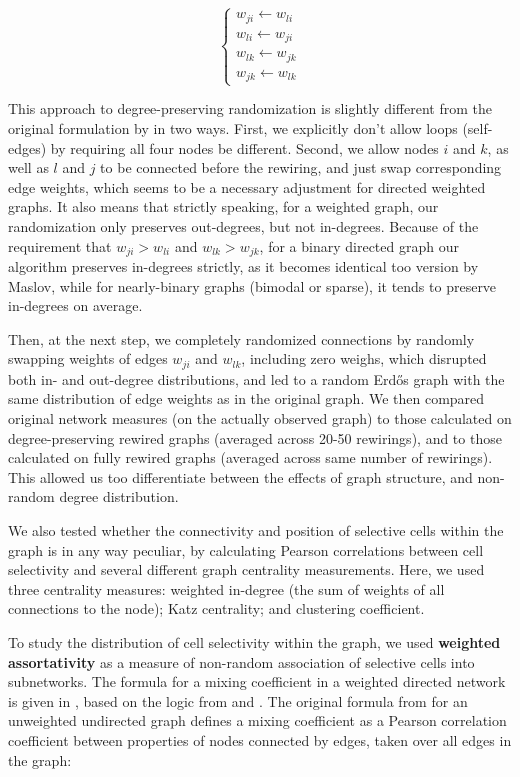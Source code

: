 \documentclass{article}
\begin{document}
\[ \left \{ \begin{array}{l}  
w_{ji} \leftarrow w_{li} \\ 
w_{li} \leftarrow w_{ji} \\
w_{lk} \leftarrow w_{jk} \\
w_{jk} \leftarrow w_{lk}
\end{array} \right. \]

This approach to degree-preserving randomization is slightly different from the original formulation by \citep{maslov2002} in two ways. First, we explicitly don’t allow loops (self-edges) by requiring all four nodes be different. Second, we allow nodes $i$ and $k$, as well as $l$ and $j$ to be connected before the rewiring, and just swap corresponding edge weights, which seems to be a necessary adjustment for directed weighted graphs. It also means that strictly speaking, for a weighted graph, our randomization only preserves out-degrees, but not in-degrees. Because of the requirement that $w_{ji}>w_{li}$ and $w_{lk}>w_{jk}$, for a binary directed graph our algorithm preserves in-degrees strictly, as it becomes identical too version by Maslov, while for nearly-binary graphs (bimodal or sparse), it tends to preserve in-degrees on average.

Then, at the next step, we completely randomized connections by randomly swapping weights of edges $w_{ji}$ and $w_{lk}$, including zero weighs, which disrupted both in- and out-degree distributions, and led to a random Erd\H{o}s graph with the same distribution of edge weights as in the original graph. We then compared original network measures (on the actually observed graph) to those calculated on degree-preserving rewired graphs (averaged across 20-50 rewirings), and to those calculated on fully rewired graphs (averaged across same number of rewirings). This allowed us too differentiate between the effects of graph structure, and non-random degree distribution.

We also tested whether the connectivity and position of selective cells within the graph is in any way peculiar, by calculating Pearson correlations between cell selectivity and several different graph centrality measurements. Here, we used three centrality measures: weighted in-degree (the sum of weights of all connections to the node); Katz centrality; and clustering coefficient.

To study the distribution of cell selectivity within the graph, we used \textbf{weighted assortativity} as a measure of non-random association of selective cells into subnetworks. The formula for a mixing coefficient in a weighted directed network is given in \citep{farine2014weighted}, based on the logic from \citep{newman2003mixing} and \citep{leung2007weighted}. The original formula from \citep{newman2003mixing} for an unweighted undirected graph defines a mixing coefficient as a Pearson correlation coefficient between properties of nodes connected by edges, taken over all edges in the graph:
\end{document}
